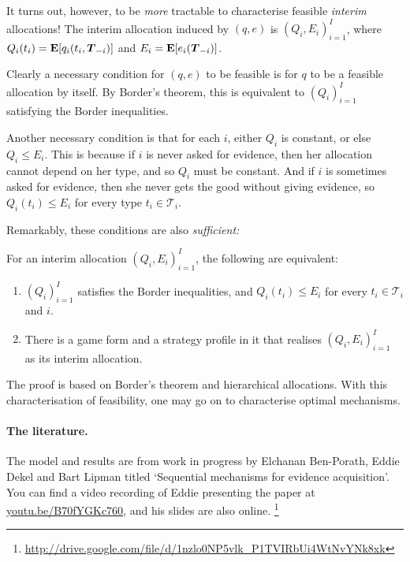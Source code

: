 It turns out, however, to be \emph{more} tractable to characterise feasible \emph{interim} allocations!
The interim allocation induced by $(q,e)$ is $(Q_i,E_i)_{i=1}^I$,
where $Q_i(t_i) = \E \left[ q_i(t_i,\boldsymbol{T}_{-i}) \right]$ and $E_i = \E \left[ e_i(\boldsymbol{T}_{-i}) \right]$.

Clearly a necessary condition for $(q,e)$ to be feasible
is for $q$ to be a feasible allocation by itself.
By Border's theorem, this is equivalent to $(Q_i)_{i=1}^I$ satisfying the Border inequalities.

Another necessary condition is that for each $i$, either $Q_i$ is constant, or else $Q_i \leq E_i$.
This is because if $i$ is never asked for evidence, then her allocation cannot depend on her type, and so $Q_i$ must be constant.
And if $i$ is sometimes asked for evidence, then she never gets the good without giving evidence, so $Q_i(t_i) \leq E_i$ for every type $t_i \in \mathcal{T}_i$.

Remarkably, these conditions are also \emph{sufficient:}

\begin{theorem}
	\label{theorem:bdl21_feas}
	For an interim allocation $(Q_i,E_i)_{i=1}^I$, the following are equivalent:
	\begin{enumerate}
	
		\item $(Q_i)_{i=1}^I$ satisfies the Border inequalities,
		and $Q_i(t_i) \leq E_i$ for every $t_i \in \mathcal{T}_i$ and $i$.

		\item There is a game form and a strategy profile in it
		that realises $(Q_i,E_i)_{i=1}^I$ as its interim allocation.
	
	\end{enumerate}
\end{theorem}

The proof is based on Border's theorem and hierarchical allocations.
With this characterisation of feasibility, one may go on to characterise optimal mechanisms.


\paragraph{The literature.}
The model and results are from work in progress by Elchanan Ben-Porath, Eddie Dekel and Bart Lipman titled `Sequential mechanisms for evidence acquisition'.
You can find a video recording of Eddie presenting the paper at \href{http://youtu.be/B70fYGKc760}{youtu.be/B70fYGKc760}, and his slides are also online.%
	\footnote{\url{http://drive.google.com/file/d/1nzlo0NP5vlk_P1TVIRbUi4WtNvYNk8xk}}




